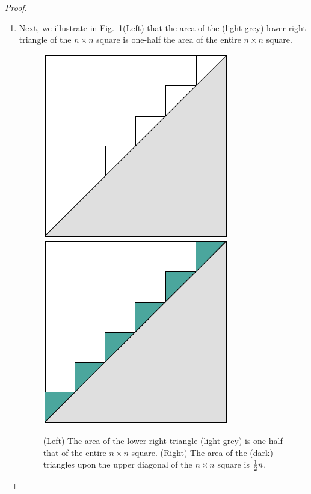 \begin{proof}
\begin{enumerate}
\medskip\item
Next, we illustrate in Fig.~\ref{fig:sumIntegersGeo2}(Left) that the area of the (light grey) lower-right triangle of the $n \times n$ square is one-half the area of the entire $n \times n$ square.
\begin{figure}[htb]
\begin{center}
       \includegraphics[scale=0.33]{FiguresMaths/SumIntegersGeometricIntermediate}
       \hspace*{.25in}
        \includegraphics[scale=0.33]{FiguresMaths/SumIntegersGeometricFinal}
\end{center}
\caption{(Left) The area of the lower-right triangle (light grey) is one-half that of the entire $n \times n$ square.  (Right) The area of the (dark) triangles upon the upper diagonal of the $n \times n$ square is ${1 \over2} n$.}
       \label{fig:sumIntegersGeo2}
\end{figure}


\end{enumerate}
\end{proof}
